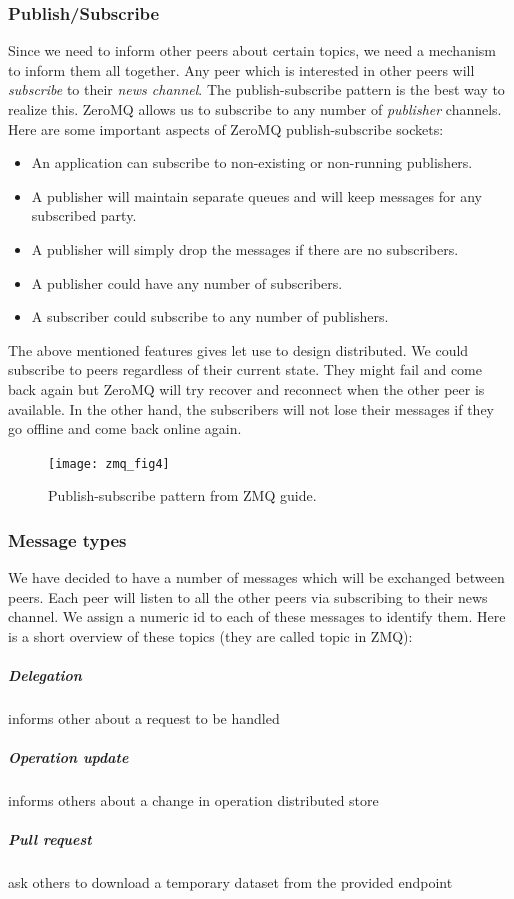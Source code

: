 \subsubsection{Publish/Subscribe}
Since we need to inform other peers about certain topics, we need a mechanism to inform them all together.
Any peer which is interested in other peers will \textit{subscribe} to their \textit{news channel}. 
The publish-subscribe pattern is the best way to realize this. 
ZeroMQ allows us to subscribe to any number of \textit{publisher} channels. 
Here are some important aspects of ZeroMQ publish-subscribe sockets:
\begin{itemize}
\item An application can subscribe to non-existing or non-running publishers.
\item A publisher will maintain separate queues and will keep messages for any subscribed party.
\item A publisher will simply drop the messages if there are no subscribers.
\item A publisher could have any number of subscribers.
\item A subscriber could subscribe to any number of publishers.
\end{itemize}

The above mentioned features gives let use to design distributed.
We could subscribe to peers regardless of their current state. 
They might fail and come back again but ZeroMQ will try recover and reconnect when the other peer is available.
In the other hand, the subscribers will not lose their messages if they go offline and come back online again.

\begin{figure}[h]
  \centering
  \texttt{[image: zmq\_fig4]}
  \caption[Publish-subscribe pattern.]
   {Publish-subscribe pattern from ZMQ guide. \cite{zguide}}
\end{figure}

\subsubsection{Message types}
We have decided to have a number of messages which will be exchanged between peers.
Each peer will listen to all the other peers via subscribing to their news channel.
We assign a numeric id to each of these messages to identify them. 
Here is a short overview of these topics (they are called topic in ZMQ):

\subparagraph{Delegation} informs other about a request to be handled
\subparagraph{Operation update} informs others about a change in operation distributed store
\subparagraph{Pull request} ask others to download a temporary dataset from the provided endpoint


